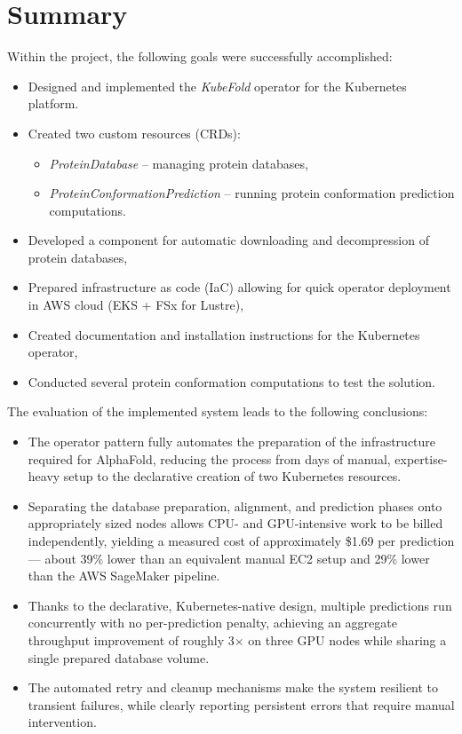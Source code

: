 \chapter{Summary}

Within the project, the following goals were successfully accomplished:
\begin{itemize}
    \item Designed and implemented the \textit{KubeFold} operator for the Kubernetes platform.
    \item Created two custom resources (CRDs):
    \begin{itemize}
        \item \textit{ProteinDatabase} -- managing protein databases,
        \item \textit{ProteinConformationPrediction} -- running protein conformation prediction computations.
    \end{itemize}
    \item Developed a component for automatic downloading and decompression of protein databases,
    \item Prepared infrastructure as code (IaC) allowing for quick operator deployment in AWS cloud (EKS + FSx for Lustre),
    \item Created documentation and installation instructions for the Kubernetes operator,
    \item Conducted several protein conformation computations to test the solution.
\end{itemize}

The evaluation of the implemented system leads to the following conclusions:
\begin{itemize}
    \item The operator pattern fully automates the preparation of the infrastructure required for AlphaFold, reducing the process from days of manual, expertise-heavy setup to the declarative creation of two Kubernetes resources.
    \item Separating the database preparation, alignment, and prediction phases onto appropriately sized nodes allows CPU- and GPU-intensive work to be billed independently, yielding a measured cost of approximately \$1.69 per prediction --- about 39\% lower than an equivalent manual EC2 setup and 29\% lower than the AWS SageMaker pipeline.
    \item Thanks to the declarative, Kubernetes-native design, multiple predictions run concurrently with no per-prediction penalty, achieving an aggregate throughput improvement of roughly 3$\times$ on three GPU nodes while sharing a single prepared database volume.
    \item The automated retry and cleanup mechanisms make the system resilient to transient failures, while clearly reporting persistent errors that require manual intervention.
\end{itemize}


